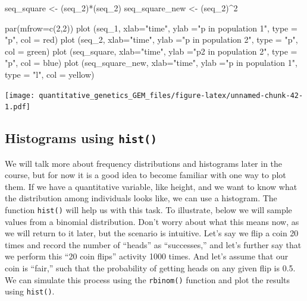 \documentclass[
]{book}
\newenvironment{Shaded}{\begin{snugshade}}{\end{snugshade}}
\newcommand{\AttributeTok}[1]{\textcolor[rgb]{0.77,0.63,0.00}{#1}}
\newcommand{\DecValTok}[1]{\textcolor[rgb]{0.00,0.00,0.81}{#1}}
\newcommand{\FunctionTok}[1]{\textcolor[rgb]{0.00,0.00,0.00}{#1}}
\newcommand{\NormalTok}[1]{#1}
\newcommand{\OtherTok}[1]{\textcolor[rgb]{0.56,0.35,0.01}{#1}}
\newcommand{\SpecialCharTok}[1]{\textcolor[rgb]{0.00,0.00,0.00}{#1}}
\newcommand{\StringTok}[1]{\textcolor[rgb]{0.31,0.60,0.02}{#1}}
\begin{document}
\begin{Shaded}
\begin{Highlighting}[]
\NormalTok{seq\_square }\OtherTok{\textless{}{-}}\NormalTok{ (seq\_2)}\SpecialCharTok{*}\NormalTok{(seq\_2)}
\NormalTok{seq\_square\_new }\OtherTok{\textless{}{-}}\NormalTok{ (seq\_2)}\SpecialCharTok{\^{}}\DecValTok{2}

\FunctionTok{par}\NormalTok{(}\AttributeTok{mfrow=}\FunctionTok{c}\NormalTok{(}\DecValTok{2}\NormalTok{,}\DecValTok{2}\NormalTok{))}
\FunctionTok{plot}\NormalTok{ (seq\_1, }\AttributeTok{xlab=}\StringTok{"time"}\NormalTok{, }\AttributeTok{ylab =}\StringTok{"p in population 1"}\NormalTok{, }\AttributeTok{type =} \StringTok{"p"}\NormalTok{, }\AttributeTok{col =} \StringTok{\textquotesingle{}red\textquotesingle{}}\NormalTok{)}
\FunctionTok{plot}\NormalTok{ (seq\_2, }\AttributeTok{xlab=}\StringTok{"time"}\NormalTok{, }\AttributeTok{ylab =}\StringTok{"p in population 2"}\NormalTok{, }\AttributeTok{type =} \StringTok{"p"}\NormalTok{, }\AttributeTok{col =} \StringTok{\textquotesingle{}green\textquotesingle{}}\NormalTok{)}
\FunctionTok{plot}\NormalTok{ (seq\_square, }\AttributeTok{xlab=}\StringTok{"time"}\NormalTok{, }\AttributeTok{ylab =}\StringTok{"p2 in population 2"}\NormalTok{, }\AttributeTok{type =} \StringTok{"p"}\NormalTok{, }\AttributeTok{col =} \StringTok{\textquotesingle{}blue\textquotesingle{}}\NormalTok{)}
\FunctionTok{plot}\NormalTok{ (seq\_square\_new, }\AttributeTok{xlab=}\StringTok{"time"}\NormalTok{, }\AttributeTok{ylab =}\StringTok{"p in population 1"}\NormalTok{, }\AttributeTok{type =} \StringTok{"l"}\NormalTok{, }\AttributeTok{col =} \StringTok{\textquotesingle{}yellow\textquotesingle{}}\NormalTok{)}
\end{Highlighting}
\end{Shaded}

\texttt{[image: quantitative\_genetics\_GEM\_files/figure-latex/unnamed-chunk-42-1.pdf]}

\hypertarget{histograms-using-hist}{%
\subsection{\texorpdfstring{Histograms using \texttt{hist()}}{Histograms using hist()}}\label{histograms-using-hist}}

We will talk more about frequency distributions and histograms later in the course, but for now it is a good idea to become familiar with one way to plot them. If we have a quantitative variable, like height, and we want to know what the distribution among individuals looks like, we can use a histogram. The function \texttt{hist()} will help us with this task. To illustrate, below we will sample values from a binomial distribution. Don't worry about what this means now, as we will return to it later, but the scenario is intuitive. Let's say we flip a coin 20 times and record the number of ``heads'' as ``successes,'' and let's further say that we perform this ``20 coin flips'' activity 1000 times. And let's assume that our coin is ``fair,'' such that the probability of getting heads on any given flip is 0.5. We can simulate this process using the \texttt{rbinom()} function and plot the results using \texttt{hist()}.
\end{document}
